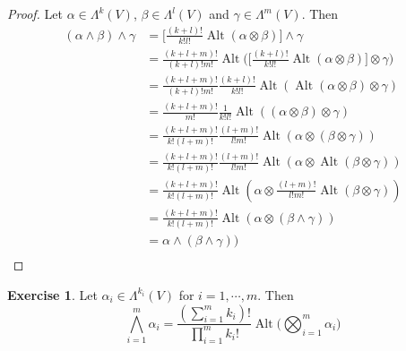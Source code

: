 \documentclass{book}
\theoremstyle{definition}
\newtheorem{ex}[definition]{Exercise}
\newcommand{\al}{\alpha}
\newcommand{\be}{\beta}
\newcommand{\gam}{\gamma}
\newcommand{\Lam}{\Lambda}
\DeclareMathOperator{\Alt}{Alt}
\DeclareMathOperator*{\0}{\mbf{0}}
\DeclareMathOperator*{\1}{\mbf{1}}
\begin{document}
	\begin{proof}
		Let $\al \in \Lam^k(V)$, $\be \in \Lam^l(V)$ and $\gam \in \Lam^m(V)$. Then 
		\begin{align*}
			(\al \wedge \be) \wedge \gam
			&= \bigg [ \frac{(k+l)!}{k! l!} \Alt(\al \otimes \be) \bigg] \wedge \gam \\ 
			&= \frac{(k+l+m)!}{(k+l)!m!} \Alt \bigg( \bigg [ \frac{(k+l)!}{k! l!} \Alt(\al \otimes \be) \bigg] \otimes \gam \bigg)  \\ 
			&= \frac{(k+l+m)!}{(k+l)!m!}  \frac{(k+l)!}{k!l!}\Alt(\Alt(\al \otimes \be) \otimes \gam) \\
			&= \frac{(k+l+m)!}{m!}  \frac{1}{k!l!} \Alt((\al \otimes \be) \otimes \gam) \\
			&= \frac{(k+l+m)!}{k!(l+m)!}  \frac{(l+m)!}{l!m!} \Alt(\al \otimes (\be \otimes \gam)) \\
			&= \frac{(k+l+m)!}{k!(l+m)!}  \frac{(l+m)!}{l!m!} \Alt(\al \otimes \Alt(\be \otimes \gam)) \\
			&= \frac{(k+l+m)!}{k!(l+m)!} \Alt(\al \otimes \frac{(l+m)!}{l!m!} \Alt(\be \otimes \gam)) \\
			&= \frac{(k+l+m)!}{k!(l+m)!} \Alt(\al \otimes (\be \wedge \gam)) \\
			&= \al \wedge (\be \wedge \gam)) \\
		\end{align*}
	\end{proof}
	
	\begin{ex}
		Let $\al_i \in \Lam^{k_i}(V)$ for $i =1, \cdots, m$. Then $$\bigwedge_{i=1}^m \al_i = \frac{(\sum_{i=1}^m k_i)!}{\prod_{i=1}^m k_i!} \Alt \bigg(\bigotimes_{i=1}^m \al_i \bigg)$$
	\end{ex}
\end{document}
